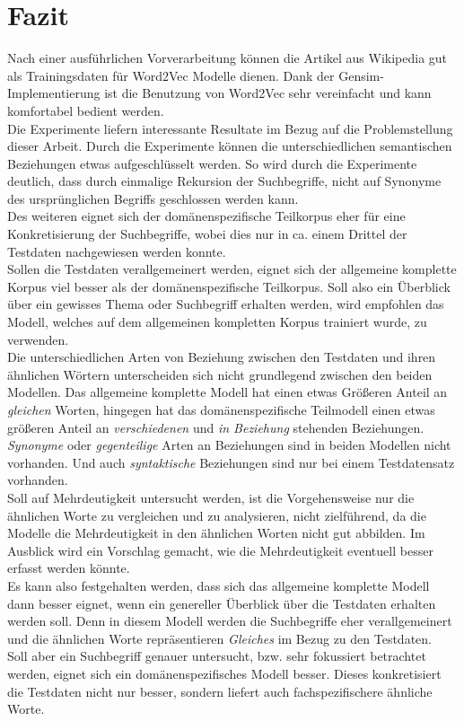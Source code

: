 \documentclass[12pt,a4paper]{report}
\begin{document}
\section{Fazit}
Nach einer ausführlichen Vorverarbeitung können die Artikel aus Wikipedia gut als Trainingsdaten für Word2Vec Modelle dienen. Dank der Gensim-Implementierung ist die Benutzung von Word2Vec sehr vereinfacht und kann komfortabel bedient werden.\\
Die Experimente liefern interessante Resultate im Bezug auf die Problemstellung dieser Arbeit. Durch die Experimente können die unterschiedlichen semantischen Beziehungen etwas aufgeschlüsselt werden.
So wird durch die Experimente deutlich, dass durch einmalige Rekursion der Suchbegriffe, nicht auf Synonyme des ursprünglichen Begriffs geschlossen werden kann.\\
Des weiteren eignet sich der domänenspezifische Teilkorpus eher für eine Konkretisierung der Suchbegriffe, wobei dies nur in ca. einem Drittel der Testdaten nachgewiesen werden konnte. \\
Sollen die Testdaten verallgemeinert werden, eignet sich der allgemeine komplette Korpus viel besser als der domänenspezifische Teilkorpus. Soll also ein Überblick über ein gewisses Thema oder Suchbegriff erhalten werden, wird empfohlen das Modell, welches auf dem allgemeinen kompletten Korpus trainiert wurde, zu verwenden.\\
Die unterschiedlichen Arten von Beziehung zwischen den Testdaten und ihren ähnlichen Wörtern unterscheiden sich nicht grundlegend zwischen den beiden Modellen. Das allgemeine komplette Modell hat einen etwas Größeren Anteil an \textit{gleichen} Worten, hingegen hat das domänenspezifische Teilmodell einen etwas größeren Anteil an \textit{verschiedenen} und \textit{in Beziehung} stehenden Beziehungen. \textit{Synonyme} oder \textit{gegenteilige} Arten an Beziehungen sind in beiden Modellen nicht vorhanden. Und auch \textit{syntaktische} Beziehungen sind nur bei einem Testdatensatz vorhanden.\\
Soll auf Mehrdeutigkeit untersucht werden, ist die Vorgehensweise nur die ähnlichen Worte zu vergleichen und zu analysieren, nicht zielführend, da die Modelle die Mehrdeutigkeit in den ähnlichen Worten nicht gut abbilden. Im Ausblick wird ein Vorschlag gemacht, wie die Mehrdeutigkeit eventuell besser erfasst werden könnte.\\


Es kann also festgehalten werden, dass sich das allgemeine komplette Modell dann besser eignet, wenn ein genereller Überblick über die Testdaten erhalten werden soll. Denn in diesem Modell werden die Suchbegriffe eher verallgemeinert und die ähnlichen Worte repräsentieren \textit{Gleiches} im Bezug zu den Testdaten.\\
Soll aber ein Suchbegriff genauer untersucht, bzw. sehr fokussiert betrachtet werden, eignet sich ein domänenspezifisches Modell besser. Dieses konkretisiert die Testdaten nicht nur besser, sondern liefert auch fachspezifischere ähnliche Worte.\\
\end{document}

